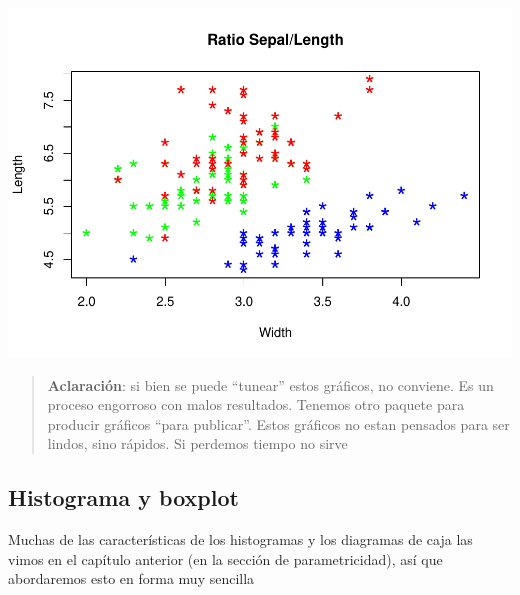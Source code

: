 \documentclass[
]{book}
\newenvironment{Shaded}{\begin{snugshade}}{\end{snugshade}}
\newcommand{\AttributeTok}[1]{\textcolor[rgb]{0.77,0.63,0.00}{#1}}
\newcommand{\ConstantTok}[1]{\textcolor[rgb]{0.00,0.00,0.00}{#1}}
\newcommand{\DocumentationTok}[1]{\textcolor[rgb]{0.56,0.35,0.01}{\textbf{\textit{#1}}}}
\newcommand{\FunctionTok}[1]{\textcolor[rgb]{0.00,0.00,0.00}{#1}}
\newcommand{\NormalTok}[1]{#1}
\newcommand{\SpecialCharTok}[1]{\textcolor[rgb]{0.00,0.00,0.00}{#1}}
\begin{document}
\includegraphics{Esatadistica_en_R_files/figure-latex/unnamed-chunk-138-1.pdf}

\begin{quote}
\textbf{Aclaración}: si bien se puede ``tunear'' estos gráficos, no conviene. Es un proceso engorroso con malos resultados. Tenemos otro paquete para producir gráficos ``para publicar''. Estos gráficos no estan pensados para ser lindos, sino rápidos. Si perdemos tiempo no sirve
\end{quote}

\hypertarget{histograma-y-boxplot}{%
\subsection{Histograma y boxplot}\label{histograma-y-boxplot}}

Muchas de las características de los histogramas y los diagramas de caja las vimos en el capítulo anterior (en la sección de parametricidad), así que abordaremos esto en forma muy sencilla

\begin{Shaded}
\end{Shaded}
\end{document}

